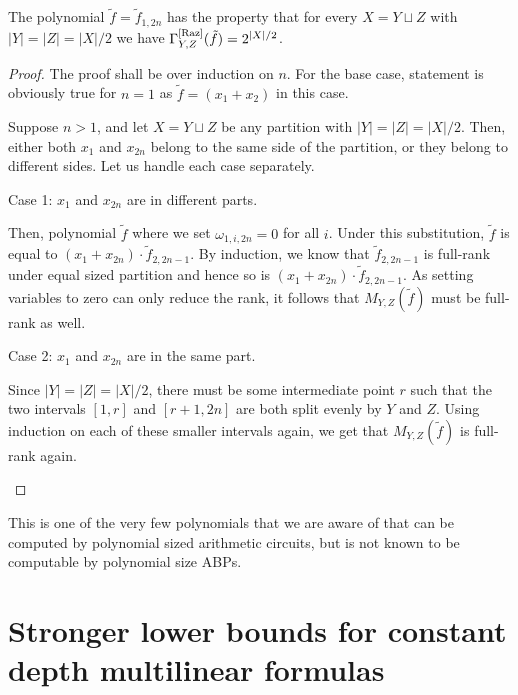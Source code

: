 \begin{lemma}[\cite{ry08}]\label{lem:fullrankpoly}
The polynomial $\tilde{f} = \tilde{f}_{1,2n}$ has the property that for every $X = Y \sqcup Z$ with $|Y| = |Z| = |X|/2$ we have $\Gamma^{\mathrm{[Raz]}}_{Y,Z}(\tilde{f}) = 2^{|X|/2}$. 
\end{lemma}
\begin{proof}
The proof shall be over induction on $n$. 
For the base case, statement is obviously true for $n = 1$ as $\tilde{f} = (x_1 + x_2)$ in this case. 

Suppose $n > 1$, and let $X = Y \sqcup Z$ be any partition with $|Y| = |Z| = |X|/2$. 
Then, either both $x_1$ and $x_{2n}$ belong to the same side of the partition, or they belong to different sides. 
Let us handle each case separately. 

\begin{description}
\item{Case 1:  $x_1$ and $x_{2n}$ are in different parts}. 

Then, polynomial $\tilde{f}$ where we set $\omega_{1,i,2n} = 0$ for all $i$. 
Under this substitution, $\tilde{f}$ is equal to $(x_1 + x_{2n})\cdot \tilde{f}_{2,2n-1}$. 
By induction, we know that $\tilde{f}_{2,2n-1}$ is full-rank under equal sized partition and hence so is $(x_1 + x_{2n}) \cdot \tilde{f}_{2,2n-1}$. 
As setting variables to zero can only reduce the rank, it follows that $M_{Y,Z}(\tilde{f})$ must be full-rank as well. 

\item{Case 2:  $x_1$ and $x_{2n}$ are in the same part}. 

Since $|Y| = |Z| = |X|/2$, there must be some intermediate point $r$ such that the two intervals $[1,r]$ and $[r+1,2n]$ are both split evenly by $Y$ and $Z$. 
Using induction on each of these smaller intervals again, we get that $M_{Y,Z}(\tilde{f})$ is full-rank again. 
\end{description}
\end{proof}

This is one of the very few polynomials that we are aware of that can be computed by polynomial sized arithmetic circuits, but is not known to be computable by polynomial size ABPs. 

\section{Stronger lower bounds for constant depth multilinear formulas}


